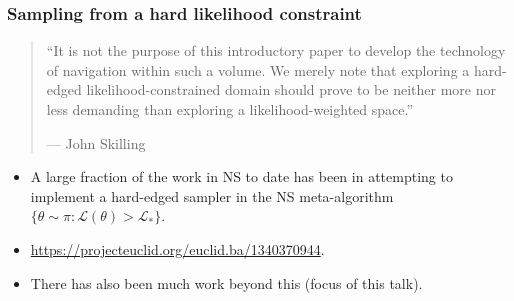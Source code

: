 \documentclass[aspectratio=169]{beamer}
\begin{document}
\begin{frame}
  \frametitle{Sampling from a hard likelihood constraint} 
  
  \begin{quote}
    ``It is not the purpose of this introductory paper to develop the technology of navigation within such a volume. We merely note that exploring a hard-edged likelihood-constrained domain should prove to be neither more nor less demanding than exploring a likelihood-weighted space.''
    
   {\hfill --- John Skilling}
  \end{quote}

  \begin{itemize}
      
    \item A large fraction of the work in NS to date has been in attempting to implement a hard-edged sampler in the NS meta-algorithm $\{\theta\sim \pi : \mathcal{L}(\theta)>\mathcal{L}_* \}$.
    \item \url{https://projecteuclid.org/euclid.ba/1340370944}.
    \item There has also been much work beyond this (focus of this talk).
  \end{itemize}
 
\end{frame}
\end{document}
